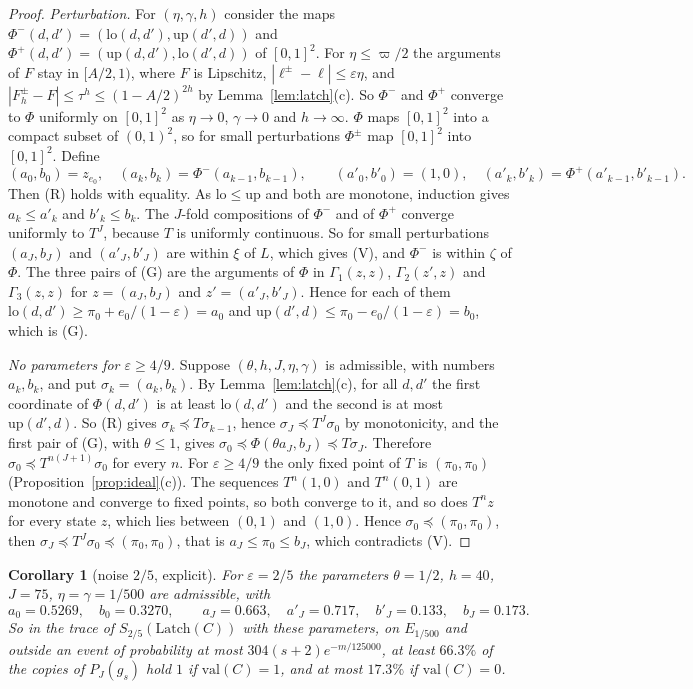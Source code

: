 \documentclass[11pt]{amsart}
\newtheorem{corollary}[theorem]{Corollary}
\theoremstyle{definition}
\theoremstyle{remark}
\newcommand{\eps}{\varepsilon}
\newcommand{\val}{\mathrm{val}}
\begin{document}
\begin{proof}
\emph{Perturbation.} For $(\eta,\gamma,h)$ consider the maps
$\Phi^-(d,d')=(\mathrm{lo}(d,d'),\mathrm{up}(d',d))$ and
$\Phi^+(d,d')=(\mathrm{up}(d,d'),\mathrm{lo}(d',d))$ of $[0,1]^2$. For $\eta\le\varpi/2$ the
arguments of $F$ stay in $[A/2,1)$, where $F$ is Lipschitz, $|\ell^\pm-\ell|\le\eps\eta$, and
$|F^\pm_h-F|\le\tau^h\le(1-A/2)^{2h}$ by Lemma~\ref{lem:latch}(c). So $\Phi^-$ and $\Phi^+$
converge to $\Phi$ uniformly on $[0,1]^2$ as $\eta\to0$, $\gamma\to0$ and $h\to\infty$. $\Phi$
maps $[0,1]^2$ into a compact subset of $(0,1)^2$, so for small perturbations $\Phi^\pm$ map
$[0,1]^2$ into $[0,1]^2$. Define
\[
(a_0,b_0)=z_{e_0},\quad(a_k,b_k)=\Phi^-(a_{k-1},b_{k-1}),\qquad
(a'_0,b'_0)=(1,0),\quad(a'_k,b'_k)=\Phi^+(a'_{k-1},b'_{k-1}).
\]
Then (R) holds with equality. As $\mathrm{lo}\le\mathrm{up}$ and both are monotone, induction
gives $a_k\le a'_k$ and $b'_k\le b_k$. The $J$-fold compositions of $\Phi^-$ and of $\Phi^+$ converge uniformly to $T^J$, because $T$ is
uniformly continuous. So for small perturbations $(a_J,b_J)$ and $(a'_J,b'_J)$ are within $\xi$ of
$L$, which gives (V), and $\Phi^-$ is within $\zeta$ of $\Phi$. The three pairs of (G) are the
arguments of $\Phi$ in $\Gamma_1(z,z)$, $\Gamma_2(z',z)$ and $\Gamma_3(z,z)$ for $z=(a_J,b_J)$ and
$z'=(a'_J,b'_J)$. Hence for each of them $\mathrm{lo}(d,d')\ge\pi_0+e_0/(1-\eps)=a_0$ and
$\mathrm{up}(d',d)\le\pi_0-e_0/(1-\eps)=b_0$, which is (G).

\emph{No parameters for $\eps\ge4/9$.} Suppose $(\theta,h,J,\eta,\gamma)$ is admissible, with
numbers $a_k,b_k$, and put $\sigma_k=(a_k,b_k)$. By Lemma~\ref{lem:latch}(c), for all $d,d'$ the
first coordinate of $\Phi(d,d')$ is at least $\mathrm{lo}(d,d')$ and the second is at most
$\mathrm{up}(d',d)$. So (R) gives $\sigma_k\preceq T\sigma_{k-1}$, hence
$\sigma_J\preceq T^J\sigma_0$ by monotonicity, and the first pair of (G), with $\theta\le1$,
gives $\sigma_0\preceq\Phi(\theta a_J,b_J)\preceq T\sigma_J$. Therefore
$\sigma_0\preceq T^{n(J+1)}\sigma_0$ for every $n$. For $\eps\ge4/9$ the only fixed point of $T$
is $(\pi_0,\pi_0)$ (Proposition~\ref{prop:ideal}(c)). The sequences $T^n(1,0)$ and $T^n(0,1)$ are
monotone and converge to fixed points, so both converge to it, and so does $T^nz$ for every state
$z$, which lies between $(0,1)$ and $(1,0)$. Hence $\sigma_0\preceq(\pi_0,\pi_0)$, then
$\sigma_J\preceq T^J\sigma_0\preceq(\pi_0,\pi_0)$, that is $a_J\le\pi_0\le b_J$, which
contradicts (V).
\end{proof}

\begin{corollary}[noise $2/5$, explicit]\label{cor:twofifths}
For $\eps=2/5$ the parameters $\theta=1/2$, $h=40$, $J=75$, $\eta=\gamma=1/500$ are admissible,
with
\[
a_0=0.5269,\quad b_0=0.3270,\qquad a_J=0.663,\quad a'_J=0.717,\quad b'_J=0.133,\quad b_J=0.173 .
\]
So in the trace of $S_{2/5}(\mathrm{Latch}(C))$ with these parameters, on $E_{1/500}$ and outside
an event of probability at most $304(s+2)e^{-m/125000}$, at least $66.3\%$ of the copies of
$P_J(g_s)$ hold $1$ if $\val(C)=1$, and at most $17.3\%$ if $\val(C)=0$.
\end{corollary}
\end{document}
